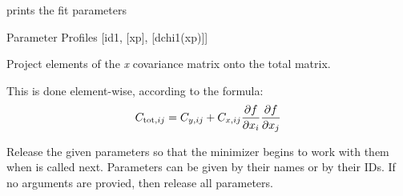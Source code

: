 \documentclass[a4paper,10pt,english]{sphinxmanual}
\begin{document}
\begin{fulllineitems}
\begin{fulllineitems}
\end{fulllineitems}


\begin{fulllineitems}
\label{module_doc:kafe.fit.Fit.print_rounded_fit_parameters}
prints the fit parameters

\end{fulllineitems}


\begin{fulllineitems}
\label{module_doc:kafe.fit.Fit.profiles}
Parameter Profiles {[}id1, {[}xp{]}, {[}dchi1(xp){]}{]}

\end{fulllineitems}


\begin{fulllineitems}
\label{module_doc:kafe.fit.Fit.project_x_covariance_matrix}
Project elements of the \emph{x} covariance matrix onto the total
matrix.

This is done element-wise, according to the formula:
\begin{gather}
\begin{split}C_{\text{tot}, ij} = C_{y, ij} + C_{x, ij}
\frac{\partial f}{\partial x_i}  \frac{\partial f}{\partial x_j}\end{split}\notag
\end{gather}
\end{fulllineitems}


\begin{fulllineitems}
\label{module_doc:kafe.fit.Fit.release_parameters}
Release the given parameters so that the minimizer begins to work with
them when  is called next. Parameters can be given by
their
names or by their IDs. If no arguments are provied, then release all
parameters.

\end{fulllineitems}


\end{fulllineitems}
\end{document}

